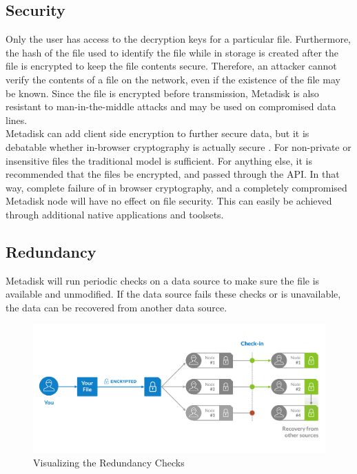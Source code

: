 \documentclass[a4paper,10pt]{article}
\begin{document}
\subsection{Security}

Only the user has access to the decryption keys for a particular file. Furthermore, the hash of the file used to identify the file while in storage is created after the file is encrypted to keep the file contents secure. Therefore, an attacker cannot verify the contents of a file on the network, even if the existence of the file may be known. Since the file is encrypted before transmission, Metadisk is also resistant to man-in-the-middle attacks and may be used on compromised data lines.   \\

Metadisk can add client side encryption to further secure data, but it is debatable whether in-browser cryptography is actually secure \cite{5}. For non-private or insensitive files the traditional model is sufficient. For anything else, it is recommended that the files be encrypted, and passed through the API. In that way, complete failure of in browser cryptography, and a completely compromised Metadisk node will have no effect on file security. This can easily be achieved through additional native applications and toolsets.   

\subsection{Redundancy}

Metadisk will run periodic checks on a data source to make sure the file is available and unmodified. If the data source fails these checks or is unavailable, the data can be recovered from another data source.
 
\begin{figure}[h!]
  \centering
      \includegraphics[width=\linewidth]{03}
  \caption{Visualizing the Redundancy Checks }
\end{figure}
\end{document}
